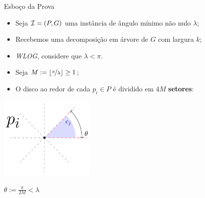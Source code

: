 \begin{frame}{Esboço da Prova}
    \begin{itemize}[<+->]
        \item Seja $\mathcal{I} = (P, G)$ uma instância de ângulo mínimo não nulo $\lambda$;

        \item Recebemos uma decomposição em árvore de $G$ com largura $k$;

        \item \emph{WLOG}, considere que $\lambda < \pi$.
    \end{itemize}
\end{frame}

\begin{frame}{}
    \begin{itemize}[<+->]
        \item Seja $M := \lfloor\nicefrac{\pi}{\lambda}\rfloor \geq 1$;

        \item O disco ao redor de cada $p_i\in P$ é dividido em $4M$ \textbf{setores}:
    \end{itemize}
    
    \bigskip
    \pause
    \begin{minipage}{\linewidth}
        \centering
        \includegraphics[height=4cm]{MSC/angle.png}
    \end{minipage}

    \bigskip
    \centering
    $\theta := \frac{\pi}{2M} < \lambda$
\end{frame}

